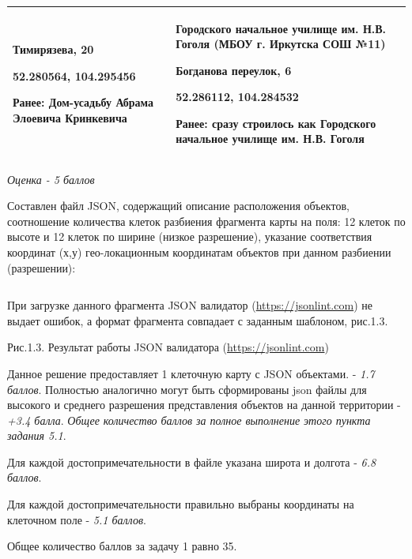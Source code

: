 \begin{longtable}{|p{7.5cm}|p{7.5cm}|}
    Тимирязева, 20
    
    52.280564, 104.295456 

    Ранее: Дом-усадьбу Абрама Элоевича Кринкевича & Городского начальное училище им. Н.В. Гоголя (МБОУ г. Иркутска СОШ №11)
    
    Богданова переулок, 6 

    52.286112, 104.284532
    
    Ранее: сразу строилось как Городского начальное училище им. Н.В. Гоголя \\
    \hline    
\end{longtable}

\textit{Оценка - 5 баллов}

Составлен файл JSON, содержащий описание расположения объектов, соотношение количества клеток  разбиения фрагмента карты на поля: 12 клеток по высоте и 12 клеток по ширине (низкое разрешение), указание соответствия координат (х,у) гео-локационным координатам объектов при данном разбиении (разрешении): 

\inputminted[fontsize=\footnotesize, linenos]{json}{final/command_tour/ar/task_01/source.json}

При загрузке данного фрагмента  JSON валидатор (\url{https://jsonlint.com}) не выдает ошибок, а формат 
фрагмента совпадает с заданным шаблоном, рис.1.3.


\begin{center}
    Рис.1.3. Результат работы  JSON валидатора (\url{https://jsonlint.com})
\end{center}

\markSection

Данное решение предоставляет 1 клеточную карту с JSON объектами. - \textit{1.7 баллов}. Полностью аналогично могут быть сформированы json файлы для высокого и среднего разрешения представления объектов на данной территории - \textit{+3.4 балла}. \textit{Общее количество баллов за полное выполнение этого пункта задания 5.1}.

Для каждой достопримечательности в файле указана широта и долгота - \textit{6.8 баллов}.

Для каждой достопримечательности правильно выбраны координаты на клеточном поле - \textit{5.1 баллов}.

Общее количество баллов за задачу 1 равно 35.